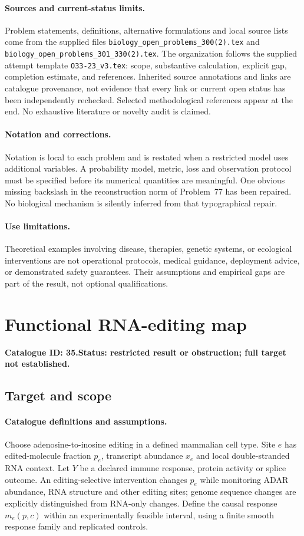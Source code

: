 \documentclass[11pt]{article}
\begin{document}
\paragraph{Sources and current-status limits.}
Problem statements, definitions, alternative formulations and local source lists
come from the supplied files
\texttt{biology\_open\_problems\_300(2).tex} and
\texttt{biology\_open\_problems\_301\_330(2).tex}.
The organization follows the supplied attempt template
\texttt{O33-23\_v3.tex}: scope, substantive calculation, explicit gap,
completion estimate, and references. Inherited source annotations and links are
catalogue provenance, not evidence that every link or current open status has
been independently rechecked. Selected methodological references appear at the
end. No exhaustive literature or novelty audit is claimed.

\paragraph{Notation and corrections.}
Notation is local to each problem and is restated when a restricted model uses
additional variables. A probability model, metric, loss and observation protocol
must be specified before its numerical quantities are meaningful. One obvious
missing backslash in the reconstruction norm of Problem~77 has been repaired.
No biological mechanism is silently inferred from that typographical repair.

\paragraph{Use limitations.}
Theoretical examples involving disease, therapies, genetic systems, or ecological
interventions are not operational protocols, medical guidance, deployment advice,
or demonstrated safety guarantees. Their assumptions and empirical gaps are part
of the result, not optional qualifications.

\setcounter{section}{34}
\section{Functional RNA-editing map}
\label{prob:035}
\noindent\textbf{Catalogue ID: 35.}\quad \textbf{Status: restricted result or obstruction; full target not established.}
\subsection{Target and scope}
\paragraph{Catalogue definitions and assumptions.}
Choose adenosine-to-inosine editing in a defined mammalian cell type. Site $e$ has edited-molecule fraction $p_e$, transcript abundance $x_e$ and local double-stranded RNA context. Let $Y$ be a declared immune response, protein activity or splice outcome. An editing-selective intervention changes $p_e$ while monitoring ADAR abundance, RNA structure and other editing sites; genome sequence changes are explicitly distinguished from RNA-only changes. Define the causal response $m_e(p,c)$ within an experimentally feasible interval, using a finite smooth response family and replicated controls.
\end{document}
